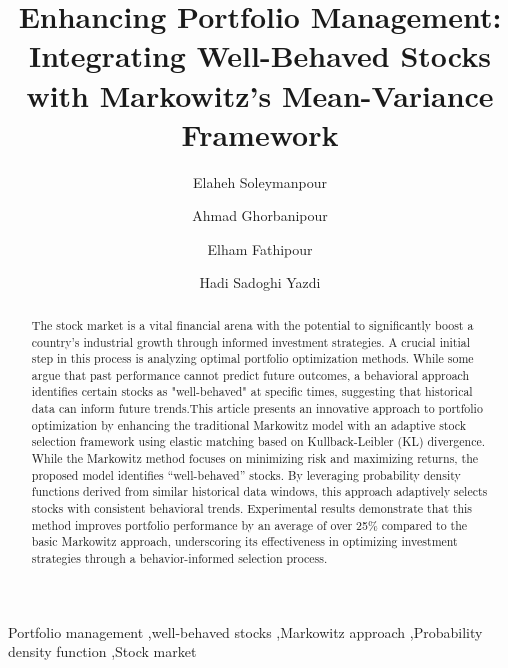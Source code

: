 \documentclass[preprint,12pt,authoryear]{elsarticle}
\begin{document}
\begin{frontmatter}

\title{Enhancing Portfolio Management: Integrating Well-Behaved Stocks with Markowitz's Mean-Variance Framework}
\author[inst1]{Elaheh Soleymanpour}
\author[inst1]{Ahmad Ghorbanipour}
\author[inst1]{Elham Fathipour}
\author{Hadi Sadoghi Yazdi}

\begin{abstract}

The stock market is a vital financial arena with the potential to significantly boost a country's industrial growth through informed investment strategies. A crucial initial step in this process is analyzing optimal portfolio optimization methods. While some argue that past performance cannot predict future outcomes, a behavioral approach identifies certain stocks as "well-behaved" at specific times, suggesting that historical data can inform future trends.This article presents an innovative approach to portfolio optimization by enhancing the traditional Markowitz model with an adaptive stock selection framework using elastic matching based on Kullback-Leibler (KL) divergence. While the Markowitz method focuses on minimizing risk and maximizing returns, the proposed model identifies “well-behaved” stocks. By leveraging probability density functions derived from similar historical data windows, this approach adaptively selects stocks with consistent behavioral trends. Experimental results demonstrate that this method improves portfolio performance by an average of over 25\% compared to the basic Markowitz approach, underscoring its effectiveness in optimizing investment strategies through a behavior-informed selection process.


\end{abstract}

\begin{keyword}
Portfolio management \sep well-behaved stocks \sep Markowitz approach \sep Probability density function \sep Stock market


\end{keyword}

\end{frontmatter}
\end{document}
